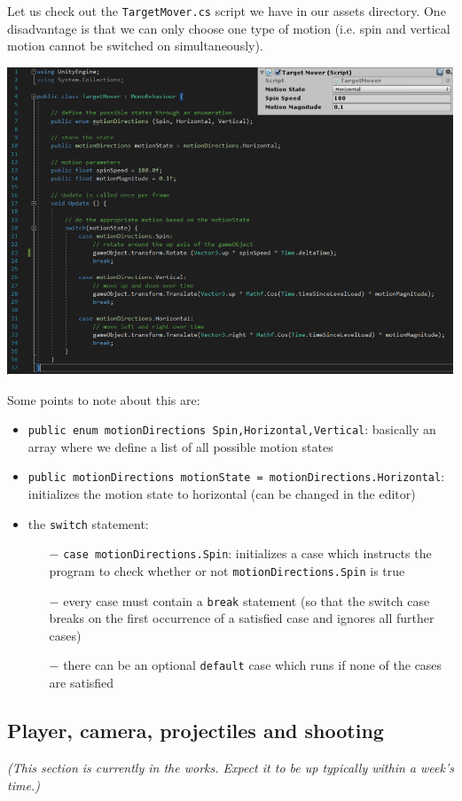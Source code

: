 \documentclass{article}[a4paper,12pt]
\theoremstyle{definition}
\begin{document}
Let us check out the \texttt{TargetMover.cs} script we have in our assets directory. One disadvantage is that we can only choose one type of motion (i.e. spin and vertical motion cannot be switched on simultaneously).
\begin{center}\includegraphics[width=\textwidth]{target_mover_enum.png}\end{center}
\pagebreak
Some points to note about this are:
\begin{itemize}
	\item \texttt{public enum motionDirections {Spin,Horizontal,Vertical}}: basically an array where we define a list of all possible motion states
	\item \texttt{public motionDirections motionState = motionDirections.Horizontal}: initializes the motion state to horizontal (can be changed in the editor)
	\item the \texttt{switch} statement:
	\begin{itemize}
		\item[$-$] \texttt{case motionDirections.Spin}: initializes a case which instructs the program to check whether or not \texttt{motionDirections.Spin} is true
		\item[$-$] every case must contain a \texttt{break} statement (so that the switch case breaks on the first occurrence of a satisfied case and ignores all further cases)
		\item[$-$] there can be an optional \texttt{default} case which runs if none of the cases are satisfied
	\end{itemize}
\end{itemize}
\subsection{Player, camera, projectiles and shooting}
\textit{(This section is currently in the works. Expect it to be up typically within a week's time.)}


\hrulefill

\end{document}
